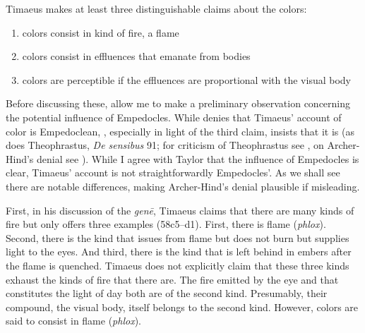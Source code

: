 Timaeus makes at least three distinguishable claims about the colors:
\begin{enumerate}[(1)]
	\item colors consist in kind of fire, a flame
	\item colors consist in effluences that emanate from bodies
	\item colors are perceptible if the effluences are proportional with the visual body
\end{enumerate}
Before discussing these, allow me to make a preliminary observation concerning the potential influence of Empedocles. While \citet[248 n3]{Archer-Hind:1888qd} denies that Timaeus' account of color is Empedoclean, \citet[480]{Taylor:1928qb}, especially in light of the third claim, insists that it is (as does Theophrastus, \emph{De sensibus} 91; for criticism of Theophrastus see \citealt[220 n239]{Stratton:1917vn}, on Archer-Hind's denial see \citealt[21 43--6]{Cook-Wilson:1889cs}). While I agree with Taylor that the influence of Empedocles is clear, Timaeus' account is not straightforwardly Empedocles'. As we shall see there are notable differences, making Archer-Hind's denial plausible if misleading.

First, in his discussion of the \emph{genē}, Timaeus claims that there are many kinds of fire but only offers three examples (58c5--d1). First, there is flame (\emph{phlox}). Second, there is the kind that issues from flame but does not burn but supplies light to the eyes. And third, there is the kind that is left behind in embers after the flame is quenched. Timaeus does not explicitly claim that these three kinds exhaust the kinds of fire that there are. The fire emitted by the eye and that constitutes the light of day both are of the second kind. Presumably, their compound, the visual body, itself belongs to the second kind. However, colors are said to consist in flame (\emph{phlox}).

